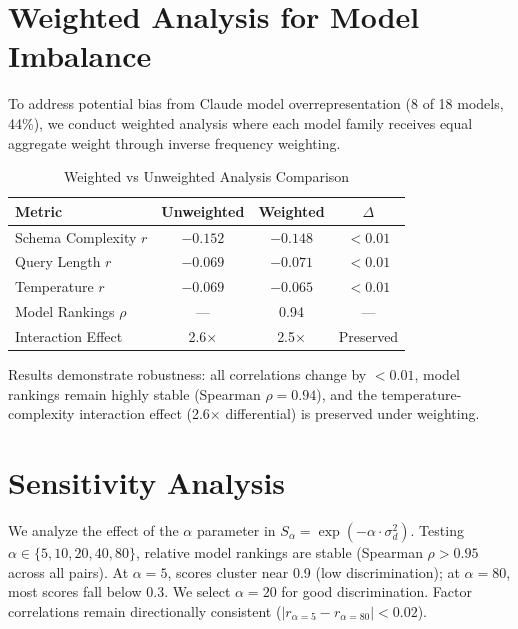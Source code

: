 \documentclass[sigconf,anonymous,review]{acmart}
\begin{document}
\appendix

\section{Weighted Analysis for Model Imbalance}
\label{app:weighted}

To address potential bias from Claude model overrepresentation (8 of 18 models, 44\%), we conduct weighted analysis where each model family receives equal aggregate weight through inverse frequency weighting.

\begin{table}[h]
\centering
\caption{Weighted vs Unweighted Analysis Comparison}
\label{tab:weighted}
\small
\begin{tabular}{@{}lccc@{}}
\toprule
\textbf{Metric} & \textbf{Unweighted} & \textbf{Weighted} & \textbf{$\Delta$} \\
\midrule
Schema Complexity $r$ & $-0.152$ & $-0.148$ & $<0.01$ \\
Query Length $r$ & $-0.069$ & $-0.071$ & $<0.01$ \\
Temperature $r$ & $-0.069$ & $-0.065$ & $<0.01$ \\
Model Rankings $\rho$ & --- & 0.94 & --- \\
Interaction Effect & 2.6$\times$ & 2.5$\times$ & Preserved \\
\bottomrule
\end{tabular}
\end{table}

Results demonstrate robustness: all correlations change by $<0.01$, model rankings remain highly stable (Spearman $\rho = 0.94$), and the temperature-complexity interaction effect (2.6$\times$ differential) is preserved under weighting.

\section{Sensitivity Analysis}
\label{app:sensitivity}

We analyze the effect of the $\alpha$ parameter in $S_\alpha = \exp(-\alpha \cdot \sigma_d^2)$. Testing $\alpha \in \{5, 10, 20, 40, 80\}$, relative model rankings are stable (Spearman $\rho > 0.95$ across all pairs). At $\alpha=5$, scores cluster near 0.9 (low discrimination); at $\alpha=80$, most scores fall below 0.3. We select $\alpha=20$ for good discrimination. Factor correlations remain directionally consistent ($|r_{\alpha=5} - r_{\alpha=80}| < 0.02$).
\end{document}
